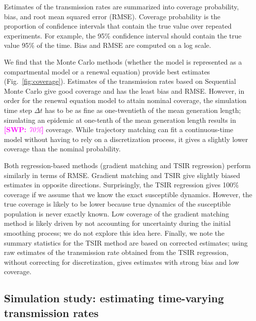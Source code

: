 \documentclass{article}
\newcommand{\fref}[1]{Fig.~\ref{fig:#1}}
\newcommand{\comment}[3]{\textcolor{#1}{\textbf{[#2: }\textsl{#3}\textbf{]}}}
\newcommand{\swp}[1]{\comment{magenta}{SWP}{#1}}
\begin{document}
Estimates of the transmission rates are summarized into coverage probability, bias, and root mean squared error (RMSE).
Coverage probability is the proportion of confidence intervals that contain the true value over repeated experiments. 
For example, the 95\% confidence interval should contain the true value 95\% of the time.
Bias and RMSE are computed on a log scale.

We find that the Monte Carlo methods (whether the model is represented as a compartmental model or a renewal equation) provide best estimates (\fref{coverage}).
Estimates of the transmission rates based on Sequential Monte Carlo give good coverage and has the least bias and RMSE.
However, in order for the renewal equation model to attain nominal coverage, the simulation time step $\Delta t$ has to be as fine as one-twentieth of the mean generation length; 
simulating an epidemic at one-tenth of the mean generation length results in \swp{70\%} coverage.
While trajectory matching can fit a continuous-time model without having to rely on a discretization process, it gives a slightly lower coverage than the nominal probability.

Both regression-based methods (gradient matching and TSIR regression) perform similarly in terms of RMSE.
Gradient matching and TSIR give slightly biased estimates in opposite directions.
Surprisingly, the TSIR regression gives 100\% coverage if we assume that we know the exact susceptible dynamics.
However, the true coverage is likely to be lower because true dynamics of the susceptible population is never exactly known.
Low coverage of the gradient matching method is likely driven by not accounting for uncertainty during the initial smoothing process; we do not explore this idea here.
Finally, we note the summary statistics for the TSIR method are based on corrected estimates; using raw estimates of the transmission rate obtained from the TSIR regression, without correcting for discretization, gives estimates with strong bias and low coverage.

\subsection{Simulation study: estimating time-varying transmission rates}
\end{document}
